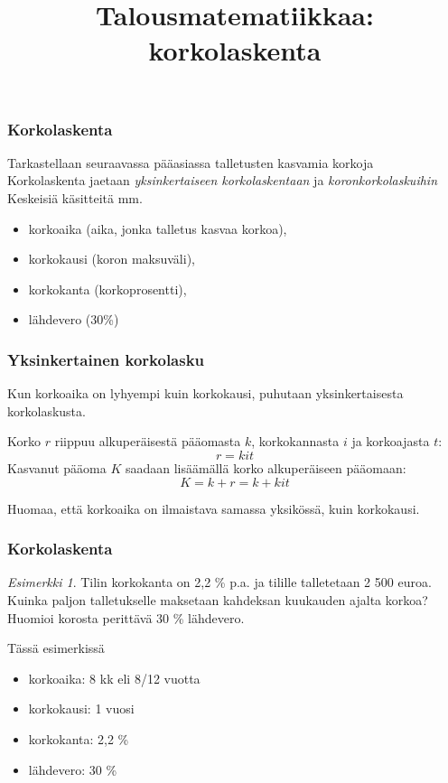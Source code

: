 \documentclass[]{beamer}\usepackage[]{graphicx}\usepackage[]{color}
\title{Talousmatematiikkaa: korkolaskenta}
\theoremstyle{remark}
\newtheorem{esim}{Esimerkki}
\newcommand{\pblock}{\\ \vspace{0.5cm}\pause}
\begin{document}
\begin{frame}
\maketitle
\end{frame}
\begin{frame}
    \frametitle{Korkolaskenta}
    Tarkastellaan seuraavassa pääasiassa talletusten kasvamia korkoja
    \pblock
    Korkolaskenta jaetaan \emph{yksinkertaiseen korkolaskentaan} ja \emph{koronkorkolaskuihin}
    \pblock
    Keskeisiä käsitteitä mm.
    \begin{itemize}
        \item korkoaika (aika, jonka talletus kasvaa korkoa),
        \item korkokausi (koron maksuväli),
        \item korkokanta (korkoprosentti),
        \item lähdevero (30\%)
    \end{itemize}
\end{frame}

\begin{frame}
    \frametitle{Yksinkertainen korkolasku}
    Kun korkoaika on lyhyempi kuin korkokausi, puhutaan yksinkertaisesta korkolaskusta.
    \pause
    \begin{block}{}
        Korko \(r\) riippuu alkuperäisestä pääomasta \(k\), korkokannasta \(i\) ja korkoajasta \(t\):\pause
        \[
        r = kit
        \]\pause
        Kasvanut pääoma \(K\) saadaan lisäämällä korko alkuperäiseen pääomaan:\pause
        \[
        K = k + r = k + kit
        \]
    \end{block}
    Huomaa, että korkoaika on ilmaistava samassa yksikössä, kuin korkokausi.
\end{frame}

\begin{frame}
    \frametitle{Korkolaskenta}
    \begin{esim}
        Tilin korkokanta on 2,2 \% p.a. ja tilille talletetaan 2 500 euroa.
        Kuinka paljon talletukselle maksetaan kahdeksan kuukauden ajalta korkoa? Huomioi korosta perittävä 30 \% lähdevero.
    \end{esim}
    \pause
    Tässä esimerkissä
    \begin{itemize}
        \item korkoaika: 8 kk eli 8/12 vuotta
        \item korkokausi: 1 vuosi
        \item korkokanta: 2,2 \%
        \item lähdevero: 30 \%
    \end{itemize}
\end{frame}
\end{document}
